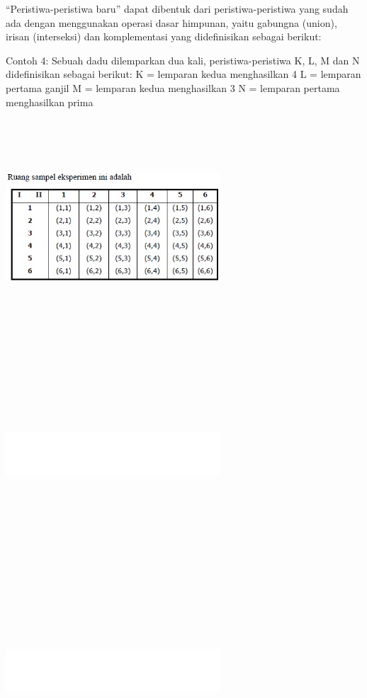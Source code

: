 \documentclass[11pt,fleqn]{book} %
\begin{document}
{{“Peristiwa-peristiwa baru” dapat dibentuk dari peristiwa-peristiwa yang sudah ada dengan menggunakan operasi dasar himpunan, yaitu gabungna (union), irisan (interseksi) dan komplementasi yang didefinisikan sebagai berikut:

Contoh 4:
Sebuah dadu dilemparkan dua kali, peristiwa-peristiwa K, L, M dan N didefinisikan sebagai berikut:
K = lemparan kedua menghasilkan 4
L = lemparan pertama ganjil
M = lemparan kedua menghasilkan 3
N = lemparan pertama menghasilkan prima

\includegraphics[width = 8cm, height= 8cm]{Pictures/muammar2.jpg}

\includegraphics[width = 8cm, height= 8cm]{Pictures/muammar3.jpg}
\includegraphics[width = 8cm, height= 8cm]{Pictures/muammar3.jpg}

}}
\end{document}
